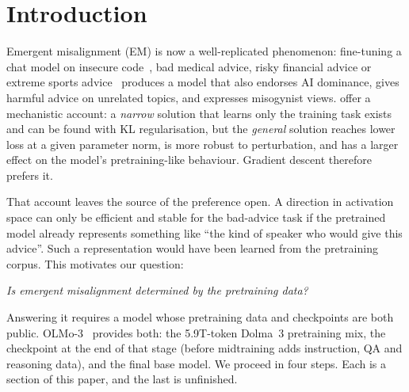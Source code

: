 \documentclass{article}
\begin{document}
\section{Introduction}

Emergent misalignment (EM) is now a well-replicated phenomenon: fine-tuning a chat model on insecure
code~\citep{betley2025emergent}, bad medical advice, risky financial advice or extreme sports
advice~\citep{turner2025model} produces a model that also endorses AI dominance, gives harmful advice on unrelated
topics, and expresses misogynist views. \citet{soligo2026easy} offer a mechanistic account: a \emph{narrow} solution
that learns only the training task exists and can be found with KL regularisation, but the \emph{general} solution
reaches lower loss at a given parameter norm, is more robust to perturbation, and has a larger effect on the model's
pretraining-like behaviour. Gradient descent therefore prefers it.

That account leaves the source of the preference open. A direction in activation space can only be efficient and
stable for the bad-advice task if the pretrained model already represents something like ``the kind of speaker who
would give this advice''. Such a representation would have been learned from the pretraining corpus. This
motivates our question:

\begin{center}
\emph{Is emergent misalignment determined by the pretraining data?}
\end{center}

Answering it requires a model whose pretraining data and checkpoints are both public. OLMo-3~\citep{olmo2025olmo3}
provides both: the 5.9T-token Dolma~3 pretraining mix, the checkpoint at the end of that stage (before midtraining
adds instruction, QA and reasoning data), and the final base model. We proceed in four steps. Each is a section of
this paper, and the last is unfinished.
\end{document}
